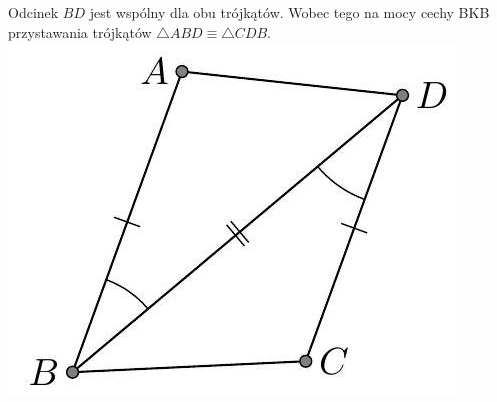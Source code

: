 \documentclass[10pt]{article}
\begin{document}
Odcinek \(B D\) jest wspólny dla obu trójkątów. Wobec tego na mocy cechy BKB przystawania trójkątów \(\triangle A B D \equiv \triangle C D B\).\\
\includegraphics[max width=\textwidth, center]{2024_11_21_71f62bd117d375398909g-047(1)}
\end{document}
